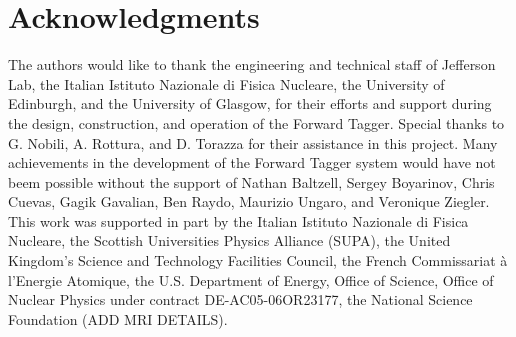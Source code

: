 \section*{Acknowledgments}

The authors would like to thank the engineering and technical staff of Jefferson Lab, the Italian Istituto
Nazionale di Fisica Nucleare, the University of Edinburgh, and the University of Glasgow, for their efforts
and support during the design, construction, and operation of the Forward Tagger. Special thanks to G. Nobili,
A. Rottura, and D. Torazza for their assistance in this project. Many achievements in the development of the Forward
Tagger system would have not beem possible without the support of Nathan Baltzell, Sergey Boyarinov, Chris Cuevas,
Gagik Gavalian, Ben Raydo, Maurizio Ungaro, and Veronique Ziegler. This work was supported in part by the Italian
Istituto Nazionale di Fisica Nucleare, the Scottish Universities Physics Alliance (SUPA), the United Kingdom's Science
and Technology Facilities Council, the French Commissariat \`{a} l'Energie Atomique, the U.S. Department of Energy,
Office of Science, Office of Nuclear Physics under contract DE-AC05-06OR23177, the National Science Foundation
(ADD MRI DETAILS). 
